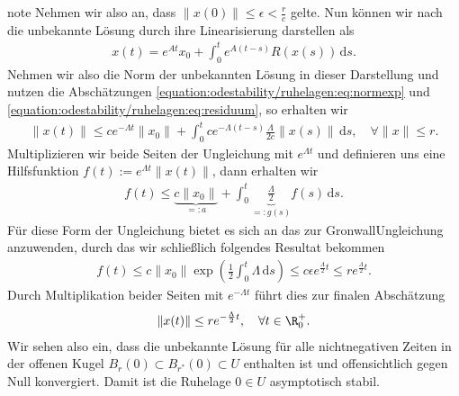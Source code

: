 \documentclass[letterpaper,10pt,german]{jupyterBook}
\begin{document}
\begin{sphinxadmonition}{note}
\sphinxAtStartPar
Nehmen wir also an, dass \(\|x(0)\| \leq \epsilon <\frac{r}{c}\) gelte.
Nun können wir nach {\hyperref[\detokenize{odestability/ruhelagen:lem:intexpglgn}]{}} die unbekannte Lösung durch ihre Linearisierung darstellen als
\begin{equation*}
\begin{split}x(t) = e^{At}x_0 + \int_0^t e^{A(t-s)} R(x(s))\, \mathrm{d}s.\end{split}
\end{equation*}
\sphinxAtStartPar
Nehmen wir also die Norm der unbekannten Lösung in dieser Darstellung und nutzen die Abschätzungen \eqref{equation:odestability/ruhelagen:eq:normexp} und \eqref{equation:odestability/ruhelagen:eq:residuum}, so erhalten wir
\begin{equation*}
\begin{split}\|x(t)\|\leq ce^{-\Lambda t}\|x_0\| + \int_0^tce^{-\Lambda (t-s)}\frac{\Lambda}{2c}\|x(s)\|\, \mathrm{d}s, \quad \forall \|x\| \leq r.\end{split}
\end{equation*}
\sphinxAtStartPar
Multiplizieren wir beide Seiten der Ungleichung mit \(e^{\Lambda t}\) und definieren uns eine Hilfsfunktion \(f(t):=e^{\Lambda t}\|x(t)\|\), dann erhalten wir
\begin{equation*}
\begin{split}f(t)\leq \underbrace{c\|x_0\|}_{=:a} + \int_0^t \underbrace{\frac{\Lambda}{2}}_{=:g(s)} f(s)\, \mathrm{d}s.\end{split}
\end{equation*}
\sphinxAtStartPar
Für diese Form der Ungleichung bietet es sich an das {\hyperref[\detokenize{odestability/ruhelagen:lemma:Gronwall}]{}} zur Gronwall\sphinxhyphen{}Ungleichung anzuwenden, durch das wir schließlich folgendes Resultat bekommen
\begin{equation*}
\begin{split}f(t) \leq c \|x_0\| \exp{\left( \frac{1}{2} \int_0^t \Lambda \, \mathrm{d}s \right) }
\leq c \epsilon e^{\frac{\Lambda}{2} t} \leq r e^{\frac{\Lambda}{2} t}.\end{split}
\end{equation*}
\sphinxAtStartPar
Durch Multiplikation beider Seiten mit \(e^{-\Lambda t}\) führt dies zur finalen Abschätzung
\begin{equation*}
\begin{split} \|x(t)\|\leq re^{-\frac{\Lambda}{2}t}, \quad \forall t\in\R^+_0.\end{split}
\end{equation*}
\sphinxAtStartPar
Wir sehen also ein, dass die unbekannte Lösung für alle nicht\sphinxhyphen{}negativen Zeiten in der offenen Kugel \(B_r(0) \subset B_{{r^\ast}}(0) \subset U\) enthalten ist und offensichtlich gegen Null konvergiert.
Damit ist die Ruhelage \(0 \in U\) asymptotisch stabil.
\end{sphinxadmonition}
\end{document}
